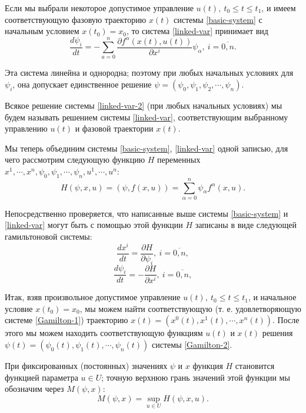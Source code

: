 \documentclass[14pt]{extreport}
\begin{document}
Если мы выбрали некоторое допустимое управление $u(t),\ t_0 \leq t \leq t_1$, и имеем соответствующую фазовую траекторию  $x(t)$ системы \eqref{basic-system} с начальным условием $x(t_0)=x_0$, то система \eqref{linked-var} принимает вид
\begin{equation}
\label{linked-var-2}
\dfrac{d\psi_i}{dt}=-\sum\limits_{a=0}^{n}\dfrac{\partial f^{\alpha}(x(t),u(t))}{\partial x^i}\psi_{\alpha},\ i=\overline{0,n}.
\end{equation}

Эта система линейна и однородна; поэтому при любых начальных условиях для $\psi_i$, она допускает единственное решение
$\psi=(\psi_0,\psi_1,\psi_2,\cdots,\psi_n)$.

Вся­кое решение системы \eqref{linked-var-2} (при любых начальных ус­ловиях) мы будем называть решением системы \eqref{linked-var}, соответствующим выбранному управлению $u(t)$ и фазо­вой траектории $x(t)$.

Мы теперь объединим системы \eqref{basic-system}, \eqref{linked-var} одной за­писью, для чего рассмотрим следующую функцию $H$ пе­ременных $x^1,\cdots,x^n,\psi_0,\psi_1,\cdots,\psi_n,u^1,\cdots,u^n$:
\begin{equation}
\label{func-H}
H(\psi,x,u)=(\psi,f(x,u))=\sum\limits_{\alpha=0}^{n} \psi_{\alpha} f^{\alpha} (x,u).
\end{equation}

Непосредственно проверяется, что написанные выше си­стемы \eqref{basic-system} и \eqref{linked-var} могут быть с помощью этой функции $H$ записаны в виде следующей гамильтоновой системы:
\begin{equation}
\label{Gamilton-1}
\dfrac{dx^i}{dt}=\dfrac{\partial H}{\partial \psi_i},\ i=\overline{0,n},
\end{equation}
\begin{equation}
\label{Gamilton-2}
\dfrac{d\psi_i}{dt}=-\dfrac{\partial H}{\partial x^i},\ i=\overline{0,n},
\end{equation}

Итак, взяв произвольное допустимое управление $u(t),\ t_0 \leq t \leq t_1 $, и начальное условие $x(t_0)=x_0$, мы можем найти соответствующую (т. е. удовлетворяющую системе \eqref{Gamilton-1}) траекторию $x(t)=(x^0(t),x^1(t),\cdots,x^n(t))$. После этого мы можем находить соответствующую функциям $u(t)$ и $x(t)$ ре­шения $\psi(t)=(\psi_0(t),\psi_1(t),\cdots,\psi_n(t))$ системы \eqref{Gamilton-2}.

При фиксированных (постоянных) значениях $\psi$ и $x$ функция $H$ становится функцией параметра $u \in U$; точ­ную верхнюю грань значений этой функции мы обозна­чим через $M(\psi,x)$:
\begin{equation}
\label{func-M}
M(\psi,x)=\sup\limits_{u\in U} H(\psi,x,u).
\end{equation}
\end{document}

